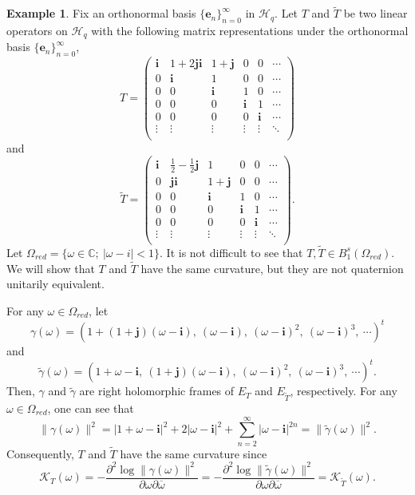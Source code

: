 \documentclass[pdflatex,sn-mathphys-num]{sn-jnl}%
\theoremstyle{thmstyleone}%
\theoremstyle{thmstyletwo}%
\newtheorem{example}{Example}%
\theoremstyle{thmstylethree}%
\theoremstyle{definition}
\newtheorem{example}[theorem]{Example}
\theoremstyle{remark}
\begin{document}
\begin{example}\label{CNDU}
Fix an orthonormal basis $\{\mathbf{e}_n\}_{n=0}^{\infty}$ in $\mathcal{H}_q$. Let $T$ and $\widetilde{T}$ be two linear operators on $\mathcal{H}_q$ with the following matrix representations under the orthonormal basis $\{\mathbf{e}_n\}_{n=0}^{\infty}$,
\[
T=
\begin{pmatrix}
\boldsymbol{i} & 1+2\boldsymbol{ji} & 1+\boldsymbol{j} & 0 & 0 & \cdots \\
0 & \boldsymbol{i} & 1 & 0 & 0 & \cdots \\
0 & 0 & \boldsymbol{i} & 1 & 0 & \cdots \\
0 & 0 & 0 & \boldsymbol{i} & 1  & \cdots \\
0 & 0 & 0 & 0 & \boldsymbol{i}  & \cdots \\
\vdots & \vdots & \vdots & \vdots & \vdots & \ddots \\
\end{pmatrix}
\]
and
\[
\widetilde{T}=\begin{pmatrix}
	\boldsymbol{i} & \frac{1}{2}-\frac{1}{2}\boldsymbol{j} & 1 & 0 & 0 & \cdots \\
	0 & \boldsymbol{ji} & 1+\boldsymbol{j} & 0 & 0 & \cdots \\
	0 & 0 & \boldsymbol{i} & 1 & 0 & \cdots \\
	0 & 0 & 0 & \boldsymbol{i} & 1  & \cdots \\
	0 & 0 & 0 & 0 & \boldsymbol{i}  & \cdots \\
	\vdots & \vdots & \vdots & \vdots & \vdots & \ddots \\
\end{pmatrix}.
\]
Let $\Omega_{red}=\{\omega\in\mathbb{C};\ |\omega-i|<1\}$. It is not difficult to see that $T,\widetilde{T}\in B_1^s(\Omega_{red})$. We will show that $T$ and $\widetilde{T}$ have the same curvature, but they are not quaternion unitarily equivalent.

   For any $\omega\in\Omega_{red}$, let
    \[
    \gamma(\omega)  =(1+(1+\boldsymbol{j})(\omega-\boldsymbol{i}),\ (\omega-\boldsymbol{i}),\ (\omega-\boldsymbol{i})^2,\
    (\omega-\boldsymbol{i})^3,\ \cdots)^t
    \]
    and
    \[
    \widetilde{\gamma}(\omega)=(1+\omega-\boldsymbol{i},\ (1+\boldsymbol{j})(\omega-\boldsymbol{i}),\ (\omega-\boldsymbol{i})^2,\
    (\omega-\boldsymbol{i})^3,\ \cdots)^t.
   \]
    Then, $\gamma$ and $\widetilde{\gamma}$ are  right holomorphic frames of $E_T$ and
    $E_{\widetilde{T}}$, respectively.  For any $\omega\in\Omega_{red}$, one can see that
    \[
    \|\gamma(\omega)\|^2=|1+{\omega}-\boldsymbol{i}|^2+2|\omega-\boldsymbol{i}|^2
    +\sum_{n=2}^{\infty}|\omega-\boldsymbol{i}|^{2n}=\|\widetilde{\gamma}(\omega)\|^2.
    \]
    Consequently, $T$ and $\widetilde{T}$ have the same curvature since
       \[
       \mathcal{K}_T(\omega)=-\frac{\partial^2 \log \|\gamma(\omega)\|^2}{\partial{\omega}\partial{\overline{\omega}}}=-\frac{\partial^2 \log \|\widetilde{\gamma}(\omega)\|^2}{\partial{\omega}\partial{\overline{\omega}}}=\mathcal{K}_{\widetilde{T}}(\omega).
       \]


\end{example}
\end{document}
